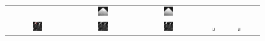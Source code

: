 \documentclass[twocolumn,twoside]{IEEEtran/IEEEtran}
\begin{document}
\begin{figure}[htbp]
\begin{tabular}{cccccc}
                                                                                                                      & \includegraphics[width=0.16\textwidth]{figures-SBA/anothergrating_40mu_zoomin}
                                                                                                                                                       & \includegraphics[width=0.16\textwidth]{figures-SBA/anothergrating_bptv_40mu_zoomin}	\\
    \includegraphics[width=0.16\textwidth]{figures-SBA/dnaforbptv_gt_framed}
                                   & \includegraphics[width=0.16\textwidth]{figures-SBA/dnaforbptv_40mu}		
                                                          & \includegraphics[width=0.16\textwidth]{figures-SBA/dnaforbptv_bptv_40mu}	
                                                                                 & \includegraphics[width=0.16\textwidth]{figures-SBA/dnaforbptv_gt_zoomin}	
                                                                                                                      & \includegraphics[width=0.16\textwidth]{figures-SBA/dnaforbptv_40mu_zoomin}

\end{tabular}
\end{figure}
\end{document}
